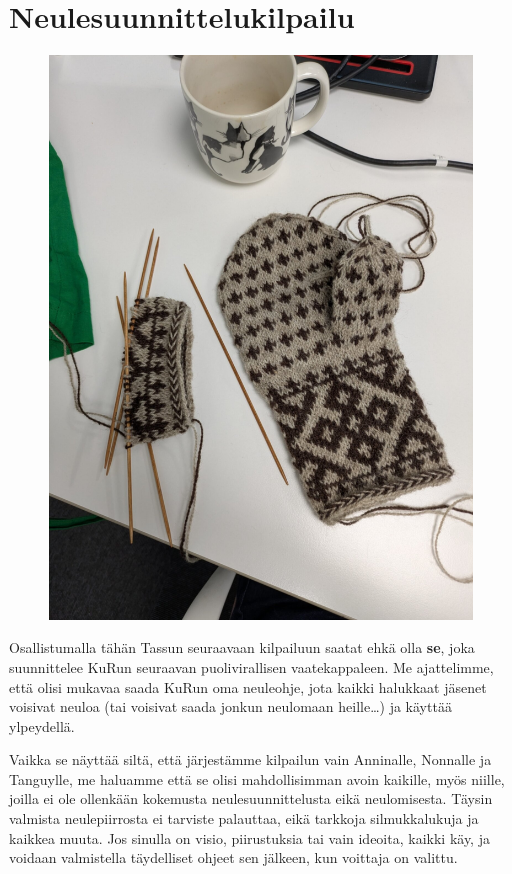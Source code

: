 
\section{Neulesuunnittelukilpailu}\label{sec:neulekilpailu}

\begin{figure}
	\noindent\includegraphics[width=0.9\linewidth]{assets/neulekilpailu1}
\end{figure}

Osallistumalla tähän Tassun seuraavaan kilpailuun saatat ehkä olla \textbf{se},
joka suunnittelee KuRun seuraavan puolivirallisen vaatekappaleen. Me
ajattelimme, että olisi mukavaa saada KuRun oma neuleohje, jota kaikki
halukkaat jäsenet voisivat neuloa {\tiny(tai voisivat saada jonkun neulomaan
heille\ldots)} ja käyttää ylpeydellä.

Vaikka se näyttää siltä, että järjestämme kilpailun vain Anninalle,
\mbox{Nonnalle} ja Tanguylle, me haluamme että se olisi mahdollisimman avoin
kaikille, myös niille, joilla ei ole ollenkään kokemusta neulesuunnittelusta
eikä neulomisesta. Täysin valmista neulepiirrosta ei tarviste palauttaa, eikä
\mbox{tarkkoja} silmukkalukuja ja kaikkea muuta. Jos sinulla on visio,
piirustuksia tai vain ideoita, kaikki käy, ja voidaan valmistella
täydelliset ohjeet sen jälkeen, kun voittaja on valittu.

